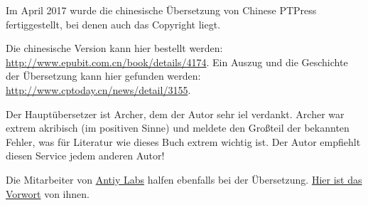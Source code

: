 Im April 2017 wurde die chinesische Übersetzung von Chinese PTPress fertiggestellt, bei denen
auch das Copyright liegt.

Die chinesische Version kann hier bestellt werden: \url{http://www.epubit.com.cn/book/details/4174}.
Ein Auszug und die Geschichte der Übersetzung kann hier gefunden werden: \url{http://www.cptoday.cn/news/detail/3155}.

Der Hauptübersetzer ist Archer, dem der Autor sehr iel verdankt.
Archer war extrem akribisch (im positiven Sinne) und meldete
den Großteil der bekannten Fehler, was für Literatur wie dieses Buch extrem wichtig ist.
Der Autor empfiehlt diesen Service jedem anderen Autor!

Die Mitarbeiter von \href{http://www.antiy.net/}{Antiy Labs} halfen ebenfalls bei der Übersetzung.
\href{http://www.epubit.com.cn/book/onlinechapter/51413}{Hier ist das Vorwort} von ihnen.

